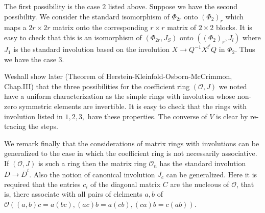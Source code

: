 \begin{enumerate}[I.]
The first possibility is the case $2$ listed above. Suppose we have
the second possibility. We consider the standard isomorphism of
$\Phi_{2r}$ onto $(\Phi_2)_{r}$ which maps a $2r\times 2r$ matrix onto
the corresponding $r\times r$ matrix of $2\times2$ blocks. It is easy
to check that this is an isomorphism of $(\Phi_{2r}, J_S)$ onto
$((\Phi_2)_r, J_l)$ where $J_{1}$ is the standard involution based on
the involution $X\to Q^{-1} X^{t^{l}}Q$ in $\Phi_2$. Thus we have the
case $3$. 

We\pageoriginale shall show later (Theorem of
Herstein-Kleinfold-Osborn-\break McCrimmon, Chap.III) that the three
possibilities for the coefficient ring $(\mathscr{O}, J)$ we noted
have a uniform characterization as the simple rings with involution
whose non-zero symmetric elements are invertible. It is easy to check
that the rings with involution listed in $1,2,3,$ have these
properties. The converse of $V$ is clear by re-tracing the steps. 

We remark finally that the considerations of matrix rings with involutions can  be generalized to the case in which the coefficient ring is not necessarily associative. If $(\mathscr{O}, J)$ is such a ring then the matrix ring $\mathscr{O}_n$ has the standard involution $D\to \overline{D}^{t}$. Also the notion of canonical involution $J_c$ can be generalized. Here it is required that the entries $c_i$ of the diagonal matrix $C$ are the nucleous of $\mathscr{O}$, that is, there associate with all pairs of elelments $a,b$ of $\mathscr{O} ((a,b)c=a(bc),(ac)b=a(cb), (ca)b=c(ab))$.
\end{enumerate}
